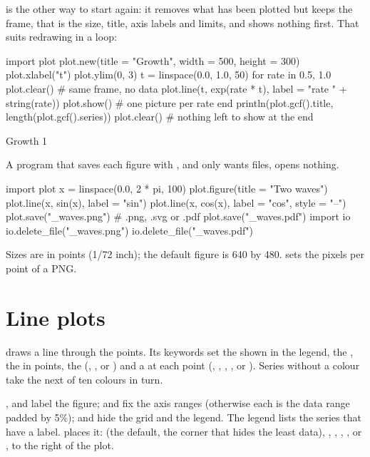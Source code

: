 \documentclass[11pt,a4paper,openany]{report}
\begin{document}
{{ is the other way to start again: it removes what has been
plotted but keeps the frame, that is the size, title, axis labels and limits,
and shows nothing first. That suits redrawing in a loop:

\begin{axon}
import plot
plot.new(title = "Growth", width = 500, height = 300)
plot.xlabel("t")
plot.ylim(0, 3)
t = linspace(0.0, 1.0, 50)
for rate in {0.5, 1.0}
  plot.clear()                    # same frame, no data
  plot.line(t, exp(rate * t), label = "rate " + string(rate))
  plot.show()                     # one picture per rate
end
println(plot.gcf().title, length(plot.gcf().series))
plot.clear()                      # nothing left to show at the end
\end{axon}
\begin{axonout}
Growth 1
\end{axonout} A program that saves each figure with
, and only wants files, opens nothing.

\begin{axon}
import plot
x = linspace(0.0, 2 * pi, 100)
plot.figure(title = "Two waves")
plot.line(x, sin(x), label = "sin")
plot.line(x, cos(x), label = "cos", style = "--")
plot.save("_waves.png")            # .png, .svg or .pdf
plot.save("_waves.pdf")
import io
io.delete_file("_waves.png")
io.delete_file("_waves.pdf")
\end{axon}

Sizes are in points (1/72 inch); the default figure is 640 by 480.
 sets the pixels per point of a PNG.

\section{Line plots}

 draws a line through the points. Its keywords set the
 shown in the legend, the , the  in points,
the  (, ,  or ) and a
 at each point (, ,
, ,  or ). Series
without a colour take the next of ten colours in turn.


,  and  label the figure;
 and  fix the axis ranges (otherwise each is
the data range padded by 5\%);  and
 hide the grid and the legend. The legend lists the
series that have a label.  places it:
 (the default, the corner that hides the least data),
, , ,
, or , to the right of the plot.

}}
\end{document}
